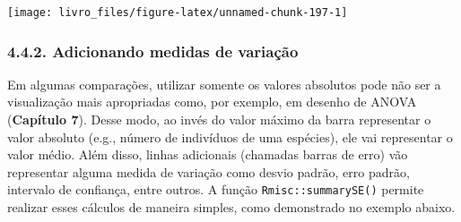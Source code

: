 \documentclass[
]{book}
\begin{document}
\begin{center}\texttt{[image: livro\_files/figure-latex/unnamed-chunk-197-1]} \end{center}

\hypertarget{adicionando-medidas-de-variauxe7uxe3o}{%
\subsubsection{4.4.2. Adicionando medidas de variação}\label{adicionando-medidas-de-variauxe7uxe3o}}

Em algumas comparações, utilizar somente os valores absolutos pode não ser a visualização mais apropriadas como, por exemplo, em desenho de ANOVA (\textbf{Capítulo 7}). Desse modo, ao invés do valor máximo da barra representar o valor absoluto (e.g., número de indivíduos de uma espécies), ele vai representar o valor médio. Além disso, linhas adicionais (chamadas barras de erro) vão representar alguma medida de variação como desvio padrão, erro padrão, intervalo de confiança, entre outros. A função \texttt{Rmisc::summarySE()} permite realizar esses cálculos de maneira simples, como demonstrado no exemplo abaixo.
\end{document}
